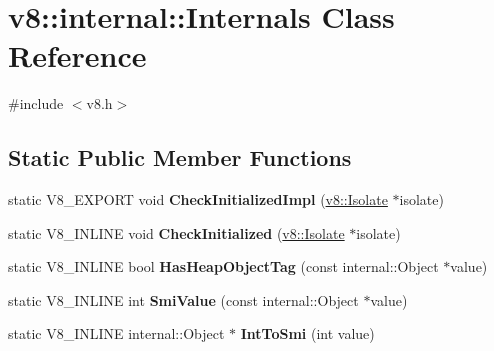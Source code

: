 \hypertarget{classv8_1_1internal_1_1Internals}{}\section{v8\+:\+:internal\+:\+:Internals Class Reference}
\label{classv8_1_1internal_1_1Internals}


{\ttfamily \#include $<$v8.\+h$>$}

\subsection*{Static Public Member Functions}
\begin{DoxyCompactItemize}
\item 
\mbox{\label{classv8_1_1internal_1_1Internals_ac5141eba7a786f0fa9f6db658f25d4ba}} 
static V8\+\_\+\+E\+X\+P\+O\+RT void {\bfseries Check\+Initialized\+Impl} (\mbox{\hyperlink{classv8_1_1Isolate}{v8\+::\+Isolate}} $\ast$isolate)
\item 
\mbox{\label{classv8_1_1internal_1_1Internals_a1aa4bc86bc011f055fe27d18e0849b8c}} 
static V8\+\_\+\+I\+N\+L\+I\+NE void {\bfseries Check\+Initialized} (\mbox{\hyperlink{classv8_1_1Isolate}{v8\+::\+Isolate}} $\ast$isolate)
\item 
\mbox{\label{classv8_1_1internal_1_1Internals_aece7d6117172e0ded0d21774e460cc28}} 
static V8\+\_\+\+I\+N\+L\+I\+NE bool {\bfseries Has\+Heap\+Object\+Tag} (const internal\+::\+Object $\ast$value)
\item 
\mbox{\label{classv8_1_1internal_1_1Internals_ad00a8fac1a3b75795d4036eae8e8ccfb}} 
static V8\+\_\+\+I\+N\+L\+I\+NE int {\bfseries Smi\+Value} (const internal\+::\+Object $\ast$value)
\item 
\mbox{\label{classv8_1_1internal_1_1Internals_a9e5ab52581c9c32ac018fb1cc98ab5fa}} 
static V8\+\_\+\+I\+N\+L\+I\+NE internal\+::\+Object $\ast$ {\bfseries Int\+To\+Smi} (int value)
\item 
\mbox{\label{classv8_1_1internal_1_1Internals_a69b0abda8cf242042f4f19bcba35fd18}} 

\end{DoxyCompactItemize}
